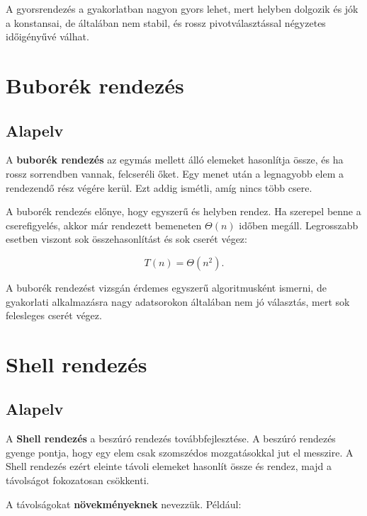 A gyorsrendezés a gyakorlatban nagyon gyors lehet, mert helyben dolgozik és jók a konstansai, de általában nem stabil, és rossz pivotválasztással négyzetes időigényűvé válhat.

\section{Buborék rendezés}

\subsection{Alapelv}

A \textbf{buborék rendezés} az egymás mellett álló elemeket hasonlítja össze, és ha rossz sorrendben vannak, felcseréli őket. Egy menet után a legnagyobb elem a rendezendő rész végére kerül. Ezt addig ismétli, amíg nincs több csere.


A buborék rendezés előnye, hogy egyszerű és helyben rendez. Ha szerepel benne a cserefigyelés, akkor már rendezett bemeneten $\Theta(n)$ időben megáll. Legrosszabb esetben viszont sok összehasonlítást és sok cserét végez:

\[
T(n)=\Theta(n^2).
\]

\begin{warningbox}
A buborék rendezést vizsgán érdemes egyszerű algoritmusként ismerni, de gyakorlati alkalmazásra nagy adatsorokon általában nem jó választás, mert sok felesleges cserét végez.
\end{warningbox}

\section{Shell rendezés}

\subsection{Alapelv}

A \textbf{Shell rendezés} a beszúró rendezés továbbfejlesztése. A beszúró rendezés gyenge pontja, hogy egy elem csak szomszédos mozgatásokkal jut el messzire. A Shell rendezés ezért eleinte távoli elemeket hasonlít össze és rendez, majd a távolságot fokozatosan csökkenti.

A távolságokat \textbf{növekményeknek} nevezzük. Például:

